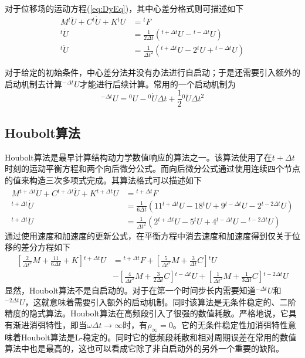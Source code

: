 对于位移场的运动方程(\ref{eq:DyEq})，其中心差分格式则可描述如下
\begin{align}
M{^{t}\!\ddot{U}}+C{^{t}\!\dot{U}}+K{^{t}\!U}&={^{t}\!F}\\
{^t\!\dot{U}}&=\frac{1}{2\Delta t}({^{t+\Delta t}\!{U}}-{^{t-\Delta t}\!{U}})\\
{^t\!\ddot{U}}&=\frac{1}{\Delta t^2}({^{t+\Delta t}\!{U}}-2{^t\!{U}}+{^{t-\Delta t}\!{U}})
\end{align}

对于给定的初始条件，中心差分法并没有办法进行自启动；于是还需要引入额外的启动机制去计算${^{-\Delta t}\!U}$才能进行后续计算。常用的一个启动机制\cite{ZhangXiong2007a}为
\begin{equation}
{^{-\Delta t}\!U}={^0\!U}-{^0\!\dot{U}}\Delta t+\frac{1}{2}{^0\!\ddot{U}}\Delta t^2
\end{equation}
\subsection{Houbolt算法}
Houbolt算法\cite{Houbolt1950}是最早计算结构动力学数值响应的算法之一。该算法使用了在$t+\Delta t$时刻的运动平衡方程和两个向后微分公式。而向后微分公式通过使用连续四个节点的值来构造三次多项式完成。其算法格式可以描述如下
\begin{subequations}
\begin{align}
M{^{t+\Delta t}\!\ddot{U}}+C{^{t+\Delta t}\!\dot{U}}+K{^{t+\Delta t}\!U}&={^{t+\Delta t}\!F}\\
{^{t+\Delta t}\!\dot{U}}&=\frac{1}{6\Delta t}(11{^{t+\Delta t}\!U}-18{^{t}\!U}+9{^{t-\Delta t}\!U}-2{^{t-2\Delta t}\!U})\\
{^{t+\Delta t}\!\ddot{U}}&=\frac{1}{\Delta t^2}(2{^{t+\Delta t}\!U}-5{^{t}\!U}+4{^{t-\Delta t}\!U}-{^{t-2\Delta t}\!U})
\end{align}
\end{subequations}
通过使用速度和加速度的更新公式，在平衡方程中消去速度和加速度得到仅关于位移的差分方程如下
\begin{equation}
\begin{split}
\left[\frac{2}{\Delta t^2}M+\frac{11}{6\Delta t}+K\right]{^{t+\Delta t}\!U}&={^{t+\Delta t}\!F}+\left[\frac{5}{\Delta t^2}M+\frac{3}{\Delta t}C\right]{^t\!U}\\
&-\left[\frac{4}{\Delta t^2}M+\frac{3}{2\Delta t}C\right]{^{t-\Delta t}\!U}+\left[\frac{1}{\Delta t^2}M+\frac{1}{3\Delta t}C\right]{^{t-2\Delta t}\!U}
\end{split}
\end{equation}
显然，Houbolt算法不是自启动的。对于在第一个时间步长内需要知道${^{-\Delta t}\!U}$和${^{-2\Delta t}\!U}$，这就意味着需要引入额外的启动机制。同时该算法是无条件稳定的、二阶精度的隐式算法。Houbolt算法在高频段引入了很强的数值耗散。严格地说，它具有渐进消弭特性，即当$\omega\Delta t\to \infty$时，有$\rho_{\infty}=0$。它的无条件稳定性加消弭特性意味着Houbolt算法是L-稳定的。同时它的低频段耗散和相对周期误差在常用的数值算法中也是最高的，这也可以看成它除了非自启动外的另外一个重要的缺陷。

